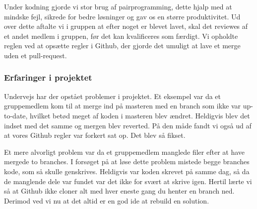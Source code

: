 Under kodning gjorde vi stor brug af pairprogramming, dette hjalp med at mindske fejl, sikrede for bedre løsninger og gav os en større produktivitet.
Ud over dette aftalte vi i gruppen at efter noget er blevet lavet, 
skal det reviewes af et andet medlem i gruppen, før det kan kvalificeres som færdigt. Vi opholdte reglen ved at opsætte regler i Github, der gjorde det umuligt at lave et merge uden et pull-request.



\subsubsection{Erfaringer i projektet}

Undervejs har der opstået problemer i projektet. Et eksempel var da et gruppemedlem kom til at merge ind på masteren med en branch som ikke var up-to-date, hvilket betød meget af koden i masteren blev ændret. Heldigvis blev det indset med det samme og mergen blev reverted. På den måde fandt vi også ud af at vores Github regler var forkert sat op. Det blev så fikset.

Et mere alvorligt problem var da et gruppemedlem manglede filer efter at have mergede to branches. I forsøget på at løse dette problem mistede begge branches kode, som så skulle genskrives. Heldigvis var koden skrevet på samme dag, så da de manglende dele var fundet var det ikke for svært at skrive igen. Hertil lærte vi så at Github ikke cloner alt med hver eneste gang du henter en branch ned. Derimod ved vi nu at det altid er en god ide at rebuild en solution.